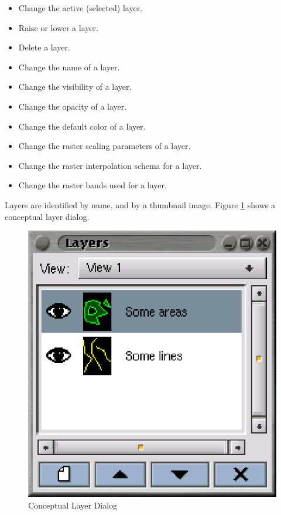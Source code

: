 \documentclass{openevreport}
\begin{document}
\begin{itemize}
\item Change the active (selected) layer.
\item Raise or lower a layer.
\item Delete a layer.
\item Change the name of a layer.
\item Change the visibility of a layer.
\item Change the opacity of a layer.
\item Change the default color of a layer.
\item Change the raster scaling parameters of a layer.
\item Change the raster interpolation schema for a layer.
\item Change the raster bands used for a layer.
\end{itemize}
Layers are identified by name, and by a thumbnail image.  Figure
\ref{fig:layerdlg} shows a conceptual layer dialog.

\begin{figure}
\centering
\includegraphics{layerdlg.eps}
\caption{Conceptual Layer Dialog}
\label{fig:layerdlg}
\end{figure}
\end{document}

